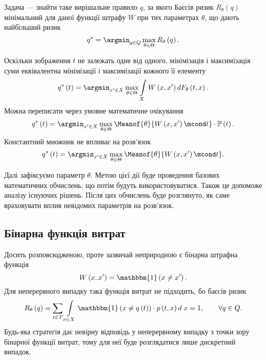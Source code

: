 Задача --- знайти таке вирішальне правило $q$,
за якого Баєсів ризик $R_{\theta}\left( q \right)$ мінімальний
для даної функції штрафу $W$ при тих параметрах $\theta$,
що дають найбільший ризик \cite{schlesinger:2002}
\begin{equation*}
  q^* = \argmin_{q \in Q}
        \max\limits_{\theta \in \Theta} R_{\theta}\left( q \right).
\end{equation*}

Оскільки зображення $t$ не залежать одне від одного,
мінімізація і максимізація суми
еквівалентна мінімізації і максимізації кожного її елементу
\begin{equation*}
  q^*\left( t \right)
  = \argmin_{x' \in X} \max\limits_{\theta \in \Theta}
    \int\limits_{X}
    W \left( x, x' \right)
    d F_{\theta}\left( t, x \right).
\end{equation*}
Можна переписати через умовне математичне очікування
\begin{equation*}
  q^*\left( t \right)
  = \argmin_{x' \in X} \max\limits_{\theta \in \Theta}
    \Meanof{\theta}{W\left( x, x' \right) \mcond t }
    \cdot \mathbb{P}\left( t \right).
\end{equation*}
Константний множник не впливає на розв'язок
\begin{equation*}
  q^*\left( t \right)
  = \argmin_{x' \in X} \max\limits_{\theta \in \Theta}
    \Meanof{\theta}{W\left( x, x' \right) \mcond t}.
\end{equation*}

Далі зафіксуємо параметр $\theta$.
Метою цієї дії буде проведення базових математичних обчислень,
що потім будуть використовуватися.
Також це допоможе аналізу існуючих рішень.
Після цих обчислень буде розглянуто,
як саме враховувати вплив невідомих параметрів на розв'язок.

\subsection{Бінарна функція витрат}

Досить розповсюдженою, проте зазвичай неприродною є бінарна штрафна функція
\begin{equation*}
  W \left( x, x' \right)
  = \mathbbm{1} \left( x \neq x' \right).
\end{equation*}
Для неперервного випадку така функція витрат не підходить,
бо баєсів ризик
\begin{equation*}
  R_{\theta}\left( q \right)
  = \sum\limits_{t \in T}
    \int\limits_{x \in X}
    \mathbbm{1} \left( x \neq q\left( t \right) \right)
    \cdot p\left( t, x \right) d\; x
  = 1,\qquad
  \forall q \in Q.
\end{equation*}
Будь-яка стратегія дає невірну відповідь у неперервному випадку
з точки зору бінарної функції витрат,
тому для неї буде розглядатися лише дискретний випадок.

